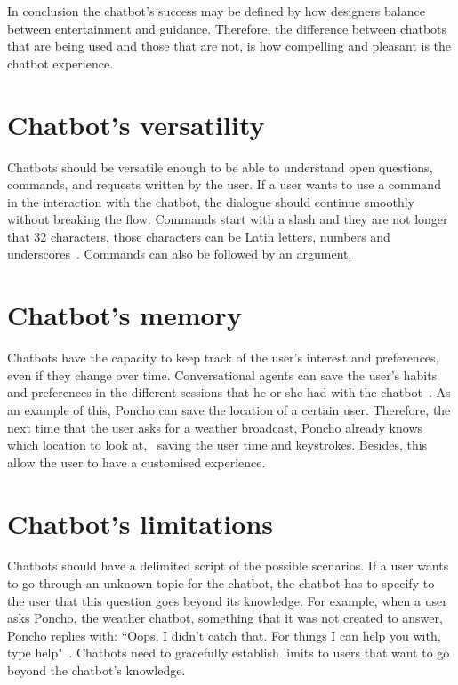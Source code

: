 \documentclass[a4paper,10pt]{article}
\begin{document}
In conclusion the chatbot’s success may be defined by how designers balance between entertainment and guidance. Therefore, the difference between chatbots that are being used and those that are not, is how compelling and pleasant is the chatbot experience.

\section{Chatbot's versatility}

Chatbots should be versatile enough to be able to understand open questions, commands, and requests written by the user. If a user wants to use a command in the interaction with the chatbot, the dialogue should continue smoothly without breaking the flow. Commands start with a slash and they are not longer that 32 characters, those characters can be Latin letters, numbers and underscores~\cite{botfather}. Commands can also be followed by an argument.  

\section{Chatbot's memory}

Chatbots have the capacity to keep track of the user's interest and preferences, even if they change over time. Conversational agents can save the user's habits and preferences in the different sessions that he or she had with the chatbot~\cite{shneiderman1997direct}. As an example of this, Poncho can save the location of a certain user. Therefore, the next time that the user asks for a weather broadcast, Poncho already knows which location to look at,~\cite{poncho2017} saving the user time and keystrokes. Besides, this allow the user to have a customised experience. 


\section{Chatbot's limitations}

Chatbots should have a delimited script of the possible scenarios. If a user wants to go through an unknown topic for the chatbot, the chatbot has to specify to the user that this question goes beyond its knowledge. For example, when a user asks Poncho, the weather chatbot, something that it was not created to answer, Poncho replies with: ``Oops, I didn't catch that. For things I can help you with, type help"~\cite{HeuristicsWebPage}. Chatbots need to gracefully establish limits to users that want to go beyond the chatbot's knowledge.  
\end{document}
